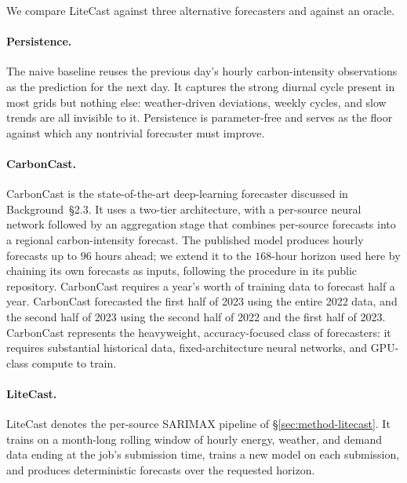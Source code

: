 We compare LiteCast against three alternative forecasters and against an oracle.

\paragraph{Persistence.}
The naive baseline reuses the previous day's hourly carbon-intensity observations as the prediction for the next day.
It captures the strong diurnal cycle present in most grids but nothing else: weather-driven deviations, weekly cycles, and slow trends are all invisible to it.
Persistence is parameter-free and serves as the floor against which any nontrivial forecaster must improve.

\paragraph{CarbonCast.}
CarbonCast \cite{maji_carboncast_2022} is the state-of-the-art deep-learning forecaster discussed in Background~\S2.3.
It uses a two-tier architecture, with a per-source neural network followed by an aggregation stage that combines per-source forecasts into a regional carbon-intensity forecast.
The published model produces hourly forecasts up to $96$ hours ahead; we extend it to the $168$-hour horizon used here by chaining its own forecasts as inputs, following the procedure in its public repository.
CarbonCast requires a year's worth of training data to forecast half a year.
CarbonCast forecasted the first half of 2023 using the entire 2022 data, and the second half of 2023 using the second half of 2022 and the first half of 2023. 
CarbonCast represents the heavyweight, accuracy-focused class of forecasters: it requires substantial historical data, fixed-architecture neural networks, and GPU-class compute to train.

\paragraph{LiteCast.}
LiteCast denotes the per-source SARIMAX pipeline of \S\ref{sec:method-litecast}.
It trains on a month-long rolling window of hourly energy, weather, and demand data ending at the job's submission time, trains a new model on each submission, and produces deterministic forecasts over the requested horizon.


